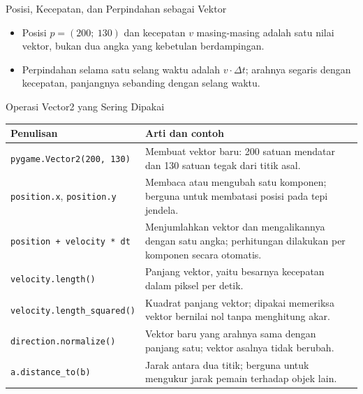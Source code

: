 \documentclass[aspectratio=169,10pt]{beamer}
\begin{document}
\begin{frame}{Posisi, Kecepatan, dan Perpindahan sebagai Vektor}
\centering
{}
\vspace{0.08cm}
\begin{itemize}
  \item Posisi $p = (200;\ 130)$ dan kecepatan $v$ masing-masing adalah satu
        nilai vektor, bukan dua angka yang kebetulan berdampingan.
  \item Perpindahan selama satu selang waktu adalah $v \cdot \Delta t$; arahnya
        segaris dengan kecepatan, panjangnya sebanding dengan selang waktu.
\end{itemize}
\end{frame}

\begin{frame}{Operasi Vector2 yang Sering Dipakai}
{\scriptsize
\renewcommand{\arraystretch}{1.10}
\begin{tabularx}{\textwidth}{@{}>{\raggedright\arraybackslash}p{4.7cm} X@{}}
\toprule
\textbf{Penulisan} & \textbf{Arti dan contoh} \\
\midrule
\texttt{pygame.Vector2(200, 130)} &
  Membuat vektor baru: 200 satuan mendatar dan 130 satuan tegak dari titik
  asal. \\
\texttt{position.x}, \texttt{position.y} &
  Membaca atau mengubah satu komponen; berguna untuk membatasi posisi pada tepi
  jendela. \\
\texttt{position + velocity * dt} &
  Menjumlahkan vektor dan mengalikannya dengan satu angka; perhitungan
  dilakukan per komponen secara otomatis. \\
\texttt{velocity.length()} &
  Panjang vektor, yaitu besarnya kecepatan dalam piksel per detik. \\
\texttt{velocity.length\_squared()} &
  Kuadrat panjang vektor; dipakai memeriksa vektor bernilai nol tanpa
  menghitung akar. \\
\texttt{direction.normalize()} &
  Vektor baru yang arahnya sama dengan panjang satu; vektor asalnya tidak
  berubah. \\
\texttt{a.distance\_to(b)} &
  Jarak antara dua titik; berguna untuk mengukur jarak pemain terhadap objek
  lain. \\
\bottomrule
\end{tabularx}}
\vspace{0.10cm}
\end{frame}
\end{document}
